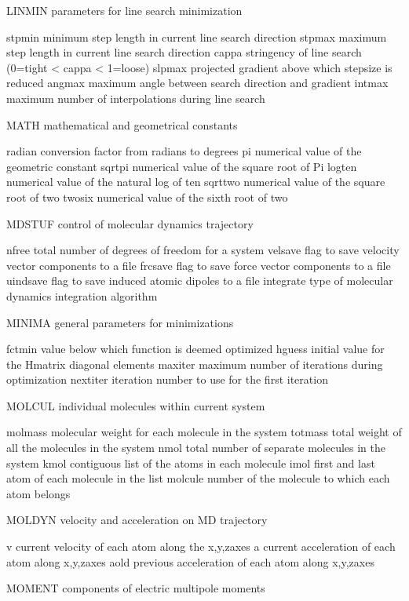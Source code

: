 \documentclass[letterpaper,11pt,english]{sphinxmanual}
\begin{document}
LINMIN  parameters for line search minimization

stpmin  minimum step length in current line search direction
stpmax  maximum step length in current line search direction
cappa   stringency of line search (0=tight \textless{} cappa \textless{} 1=loose)
slpmax  projected gradient above which stepsize is reduced
angmax  maximum angle between search direction and \sphinxhyphen{}gradient
intmax  maximum number of interpolations during line search

MATH    mathematical and geometrical constants

radian  conversion factor from radians to degrees
pi      numerical value of the geometric constant
sqrtpi  numerical value of the square root of Pi
logten  numerical value of the natural log of ten
sqrttwo numerical value of the square root of two
twosix  numerical value of the sixth root of two

MDSTUF  control of molecular dynamics trajectory

nfree   total number of degrees of freedom for a system
velsave flag to save velocity vector components to a file
frcsave flag to save force vector components to a file
uindsave        flag to save induced atomic dipoles to a file
integrate       type of molecular dynamics integration algorithm

MINIMA  general parameters for minimizations

fctmin  value below which function is deemed optimized
hguess  initial value for the H\sphinxhyphen{}matrix diagonal elements
maxiter maximum number of iterations during optimization
nextiter        iteration number to use for the first iteration

MOLCUL  individual molecules within current system

molmass molecular weight for each molecule in the system
totmass total weight of all the molecules in the system
nmol    total number of separate molecules in the system
kmol    contiguous list of the atoms in each molecule
imol    first and last atom of each molecule in the list
molcule number of the molecule to which each atom belongs

MOLDYN  velocity and acceleration on MD trajectory

v       current velocity of each atom along the x,y,z\sphinxhyphen{}axes
a       current acceleration of each atom along x,y,z\sphinxhyphen{}axes
aold    previous acceleration of each atom along x,y,z\sphinxhyphen{}axes

MOMENT  components of electric multipole moments
\end{document}
